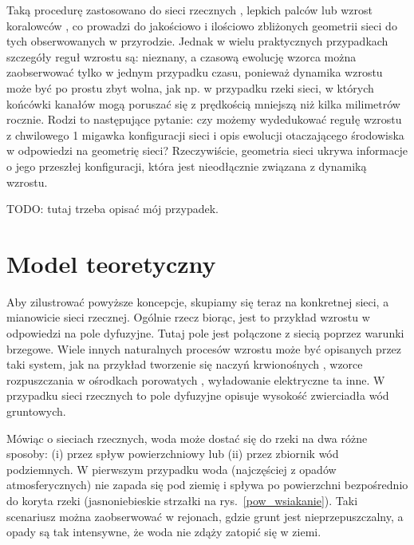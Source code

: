 \documentclass[]{pracamgr}
\begin{document}
      Taką procedurę zastosowano do sieci rzecznych \cite{devauchelle2012ramification, petroff2013bifurcation, cohen2015path, yi2017symmetric, devauchelle2017laplacian}, lepkich palców \cite{pecelerowicz2016stabilizing} lub wzrost koralowców \cite{kaandorp2001algorithmic_Chapter4.4}, co prowadzi do jakościowo i ilościowo zbliżonych geometrii sieci do tych obserwowanych w przyrodzie. Jednak w wielu praktycznych przypadkach szczegóły reguł wzrostu są: nieznany, a czasową ewolucję wzorca można zaobserwować tylko w jednym przypadku czasu, ponieważ dynamika wzrostu może być po prostu zbyt wolna, jak np. w przypadku rzeki sieci, w których końcówki kanałów mogą poruszać się z prędkością mniejszą niż kilka milimetrów rocznie. Rodzi to następujące pytanie: czy możemy wydedukować regułę wzrostu z chwilowego 1 migawka konfiguracji sieci i opis ewolucji otaczającego środowiska w odpowiedzi na geometrię sieci? Rzeczywiście, geometria sieci ukrywa informacje o jego przeszłej konfiguracji, która jest nieodłącznie związana z dynamiką wzrostu.

      TODO: tutaj trzeba opisać mój przypadek.


  \chapter{Model teoretyczny}

    Aby zilustrować powyższe koncepcje, skupiamy się teraz na konkretnej sieci, a mianowicie sieci rzecznej. Ogólnie rzecz biorąc, jest to przykład wzrostu w odpowiedzi na pole dyfuzyjne. Tutaj pole jest połączone z siecią poprzez warunki brzegowe. Wiele innych naturalnych procesów wzrostu może być opisanych przez taki system, jak na przykład tworzenie się naczyń krwionośnych \cite{nguyen2006dynamics}, wzorce rozpuszczania w ośrodkach porowatych \cite{szymczak2011initial}, wyładowanie elektryczne \cite{niemeyer1984fractal} ta inne. W przypadku sieci rzecznych to pole dyfuzyjne opisuje wysokość zwierciadła wód gruntowych.

    Mówiąc o sieciach rzecznych, woda może dostać się do rzeki na dwa różne sposoby: (i) przez spływ powierzchniowy lub (ii) przez zbiornik wód podziemnych. W pierwszym przypadku woda (najczęściej z opadów atmosferycznych) nie zapada się pod ziemię i spływa po powierzchni bezpośrednio do koryta rzeki (jasnoniebieskie strzałki na rys.~\ref{pow_wsiakanie}). Taki scenariusz można zaobserwować w rejonach, gdzie grunt jest nieprzepuszczalny, a opady są tak intensywne, że woda nie zdąży zatopić się w ziemi.
\end{document}
